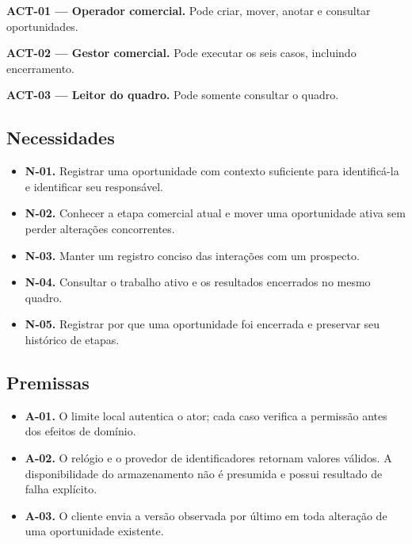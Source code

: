 \documentclass[10pt,a4paper]{article}
\begin{document}
\textbf{ACT-01 --- Operador comercial.} Pode criar, mover, anotar e consultar oportunidades.

\textbf{ACT-02 --- Gestor comercial.} Pode executar os seis casos, incluindo encerramento.

\textbf{ACT-03 --- Leitor do quadro.} Pode somente consultar o quadro.

\subsection{Necessidades}

\begin{itemize}

\item \textbf{N-01.} Registrar uma oportunidade com contexto suficiente para identificá-la e identificar seu responsável.

\item \textbf{N-02.} Conhecer a etapa comercial atual e mover uma oportunidade ativa sem perder alterações concorrentes.

\item \textbf{N-03.} Manter um registro conciso das interações com um prospecto.

\item \textbf{N-04.} Consultar o trabalho ativo e os resultados encerrados no mesmo quadro.

\item \textbf{N-05.} Registrar por que uma oportunidade foi encerrada e preservar seu histórico de etapas.

\end{itemize}

\subsection{Premissas}

\begin{itemize}

\item \textbf{A-01.} O limite local autentica o ator; cada caso verifica a permissão antes dos efeitos de domínio.

\item \textbf{A-02.} O relógio e o provedor de identificadores retornam valores válidos. A disponibilidade do armazenamento não é presumida e possui resultado de falha explícito.

\item \textbf{A-03.} O cliente envia a versão observada por último em toda alteração de uma oportunidade existente.

\end{itemize}
\end{document}
